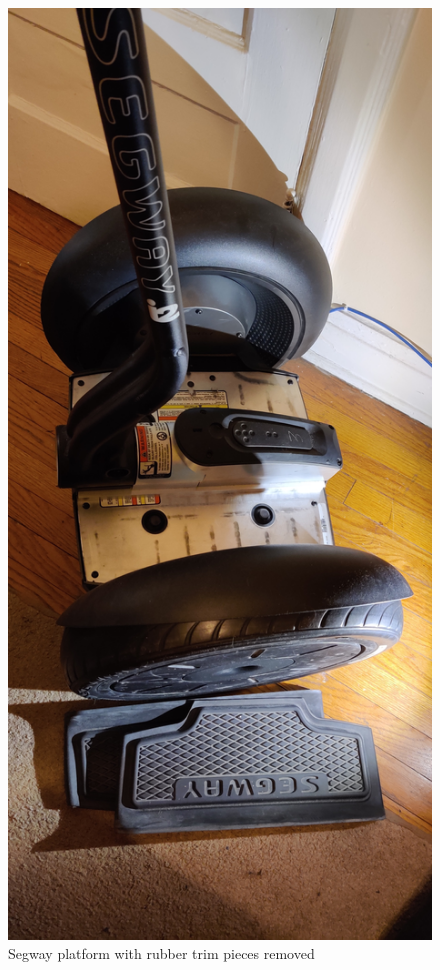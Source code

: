 \documentclass[]{formalLabReport}
\begin{document}
\begin{figure}
    \includegraphics[angle=-90]{segwayPadsRemoved.jpg}
    \caption{Segway platform with rubber trim pieces removed}
    \label{fig:segwayPadsRemoved.jpg}
\end{figure}
\end{document}
